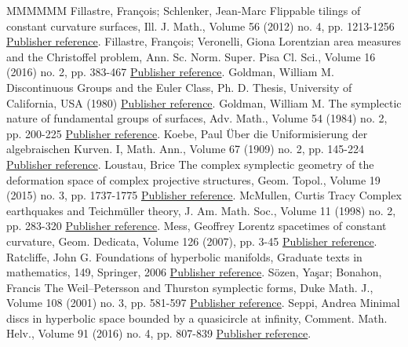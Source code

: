 \documentclass[11pt]{article}
\theoremstyle{definition}
\numberwithin{equation}{section}
\numberwithin{figure}{section}
\numberwithin{table}{section}
\begin{document}
\begin{thebibliography}{MMMMMM}
 Fillastre, François; Schlenker, Jean-Marc Flippable tilings of constant curvature surfaces, Ill. J. Math., Volume 56 (2012) no. 4, pp. 1213-1256 \href{https://ahl.centre-mersenne.org/item/AHL_2020__3__873_0/#flippable}{Publisher reference}.
 Fillastre, François; Veronelli, Giona Lorentzian area measures and the Christoffel problem, Ann. Sc. Norm. Super. Pisa Cl. Sci., Volume 16 (2016) no. 2, pp. 383-467 \href{https://ahl.centre-mersenne.org/item/AHL_2020__3__873_0/#Fillastre}{Publisher reference}.
 Goldman, William M. Discontinuous Groups and the Euler Class, Ph. D. Thesis, University of California, USA (1980) \href{https://ahl.centre-mersenne.org/item/AHL_2020__3__873_0/#goldmanthesis}{Publisher reference}.
 Goldman, William M. The symplectic nature of fundamental groups of surfaces, Adv. Math., Volume 54 (1984) no. 2, pp. 200-225 \href{https://ahl.centre-mersenne.org/item/AHL_2020__3__873_0/#Goldman}{Publisher reference}.
 Koebe, Paul Über die Uniformisierung der algebraischen Kurven. I, Math. Ann., Volume 67 (1909) no. 2, pp. 145-224 \href{https://ahl.centre-mersenne.org/item/AHL_2020__3__873_0/#koebeunif}{Publisher reference}.
 Loustau, Brice The complex symplectic geometry of the deformation space of complex projective structures, Geom. Topol., Volume 19 (2015) no. 3, pp. 1737-1775 \href{https://ahl.centre-mersenne.org/item/AHL_2020__3__873_0/#bricegt}{Publisher reference}.
 McMullen, Curtis Tracy Complex earthquakes and Teichmüller theory, J. Am. Math. Soc., Volume 11 (1998) no. 2, pp. 283-320 \href{https://ahl.centre-mersenne.org/item/AHL_2020__3__873_0/#mcmullerearth}{Publisher reference}.
 Mess, Geoffrey Lorentz spacetimes of constant curvature, Geom. Dedicata, Volume 126 (2007), pp. 3-45 \href{https://ahl.centre-mersenne.org/item/AHL_2020__3__873_0/#mess}{Publisher reference}.
 Ratcliffe, John G. Foundations of hyperbolic manifolds, Graduate texts in mathematics, 149, Springer, 2006 \href{https://ahl.centre-mersenne.org/item/AHL_2020__3__873_0/#opac-b1124711}{Publisher reference}.
 Sözen, Yaşar; Bonahon, Francis The Weil–Petersson and Thurston symplectic forms, Duke Math. J., Volume 108 (2001) no. 3, pp. 581-597 \href{https://ahl.centre-mersenne.org/item/AHL_2020__3__873_0/#SB}{Publisher reference}.
 Seppi, Andrea Minimal discs in hyperbolic space bounded by a quasicircle at infinity, Comment. Math. Helv., Volume 91 (2016) no. 4, pp. 807-839 \href{https://ahl.centre-mersenne.org/item/AHL_2020__3__873_0/#seppiminimal}{Publisher reference}.

\end{thebibliography}
\end{document}

